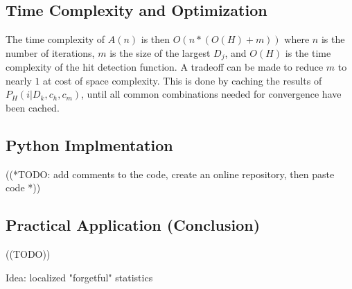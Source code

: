 \documentclass{article}
\newcommand{\br}{ \hfill \break}
\begin{document}
\begin{adjustwidth}{2.5em}{0pt}
    \subsection{Time Complexity and Optimization}
        The time complexity of $A(n)$ is then $O(n * (O(H) + m))$ where $n$ is the number of iterations, $m$ is the size of the largest $D_j$, and $O(H)$ is the time complexity of the hit detection function. A tradeoff can be made to reduce $m$ to nearly $1$ at cost of space complexity. This is done by caching the results of $P_H(i | D_k, c_h, c_m)$, until all common combinations needed for convergence have been cached.
    
    \subsection{Python Implmentation}
        ((*TODO: add comments to the code, create an online repository, then paste code *))\br\br
    
    \subsection{Practical Application (Conclusion)}
        ((TODO))\br
        
        Idea: localized "forgetful" statistics
        

%
%
\end{adjustwidth} \br
%
\end{document}
